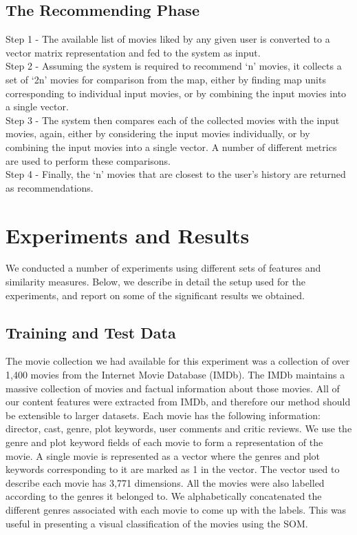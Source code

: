 \documentclass[conference]{IEEEtran}
\begin{document}
\subsection{The Recommending Phase}
Step 1 - The available list of movies liked by any given user is converted to a vector matrix representation and fed to the system as input. 
\vspace{2mm}
\\\indent Step 2 - Assuming the system is required to recommend ‘n’ movies, it collects a set of ‘2n’ movies for comparison from the map, either by finding map units corresponding to individual input movies, or by combining the input movies into a single vector. 
\vspace{2mm}
\\\indent Step 3 - The system then compares each of the collected movies with the input movies, again, either by considering the input movies individually, or by combining the input movies into a single vector. A number of different metrics are used to perform these comparisons. 
\vspace{2mm}
\\\indent Step 4 - Finally, the ‘n’ movies that are closest to the user’s history are returned as recommendations. 


\section{Experiments and Results}
We conducted a number of experiments using different sets of features and similarity measures. Below, we describe in detail the setup used for the experiments, and report on some of the significant results we obtained. 

\subsection{Training and Test Data}

The movie collection we had available for this experiment was a collection of over 1,400 movies from the Internet Movie Database (IMDb). The IMDb maintains a massive collection of movies and factual information about those movies. All of our content features were extracted from IMDb, and therefore our method should be extensible to larger datasets. Each movie has the following information: director, cast, genre, plot keywords, user comments and critic reviews. We use the genre and plot keyword fields of each movie to form a representation of the movie. A single movie is represented as a vector where the genres and plot keywords corresponding to it are marked as 1 in the vector. The vector used to describe each movie has 3,771 dimensions. All the movies were also labelled according to the genres it belonged to. We alphabetically concatenated the different genres associated with each movie to come up with the labels. This was useful in presenting a visual classification of the movies using the SOM.
\end{document}
